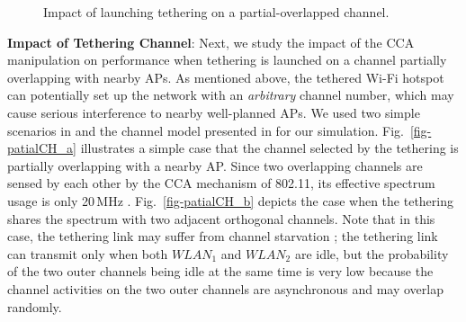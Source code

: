 \begin{figure} [t]
{      }
    \caption{Impact of launching tethering on a partial-overlapped channel.}
    \label{fig:motive_A}
\end{figure}


%
\textbf{Impact of Tethering Channel}:
%
Next, we study the impact of the CCA manipulation on performance
when tethering is launched on a channel partially overlapping
with nearby APs. As mentioned above,
the tethered Wi-Fi hotspot can potentially set up the network with
an \emph{arbitrary} channel number, which may cause serious interference
to nearby well-planned APs.
We used two simple scenarios in \cite{zhang:shin11icnp} and the
channel model presented in \cite{Mishra:Arbaugh05} for our simulation.
Fig.~\ref{fig-patialCH_a} illustrates a simple case that the channel
selected by the tethering is partially overlapping with a nearby AP.
Since two overlapping channels are sensed by each other by the CCA
mechanism of 802.11, its effective spectrum usage is
only 20\,MHz \cite{zhang:shin11icnp}.
%
Fig.~\ref{fig-patialCH_b} depicts the case when the tethering shares
the spectrum with two adjacent orthogonal channels.
Note that in this case, the tethering link may suffer from channel
starvation \cite{zhang:shin11icnp}; the tethering link can transmit
only when both $WLAN_1$ and $WLAN_2$ are idle, but the probability of
the two outer channels being idle at the same time is very low
because the channel activities on the two outer channels are
asynchronous and may overlap randomly.


